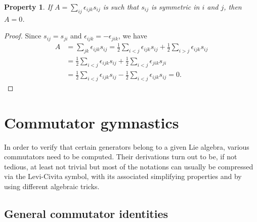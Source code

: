 \documentclass[12pt,a4paper]{report}
\newtheorem{property}{Property}[section]
\theoremstyle{definition}
\theoremstyle{remark}
\theoremstyle{remark}
\begin{document}
\begin{appendices}
\begin{property}\label{plc5}
If $A=\sum_{ij}\epsilon_{ijk}s_{ij}$ is such that $s_{ij}$ is symmetric in $i$ and $j$, then $A=0$.
\end{property}
\begin{proof}
Since $s_{ij}=s_{ji}$ and $\epsilon_{ijk}=-\epsilon_{jik}$, we have
\begin{align*}
A &= \sum_{jk}\epsilon_{ijk}s_{ij}=\frac{1}{2}\sum_{i<j}\epsilon_{ijk}s_{ij}+\frac{1}{2}\sum_{i>j}\epsilon_{ijk}s_{ij} \\
&= \frac{1}{2}\sum_{i<j}\epsilon_{ijk}s_{ij}+\frac{1}{2}\sum_{i<j}\epsilon_{jik}s_{ji} \\
&= \frac{1}{2}\sum_{i<j}\epsilon_{ijk}s_{ij}-\frac{1}{2}\sum_{i<j}\epsilon_{ijk}s_{ij} =0.
\end{align*}
\end{proof}

\chapter{Commutator gymnastics}
In order to verify that certain generators belong to a given Lie algebra, various commutators need to be computed. Their derivations turn out to be, if not tedious, at least not trivial but most of the notations can usually be compressed via the Levi-Civita symbol, with its associated simplifying properties and by using different algebraic tricks. 


\section{General commutator identities}


\end{appendices}
\end{document}
